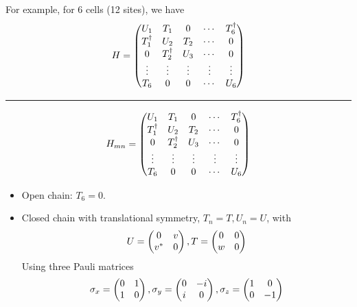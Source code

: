 \documentclass[letterpaper,10pt,english]{sphinxmanual}
\begin{document}
For example, for 6 cells (12 sites), we have
\begin{gather}
\begin{split}H=\begin{pmatrix}U_1&T_1&0&\cdots&T_6^\dagger\\
T_1^\dagger&U_2&T_2&\cdots&0\\
0&T_2^\dagger&U_3&\cdots&0\\
\vdots&\vdots&\vdots&\vdots&\vdots\\
T_6&0&0&\cdots&U_6
\end{pmatrix}\end{split}\notag
\end{gather}

\bigskip\hrule{}\bigskip

\begin{gather}
\begin{split}H_{mn}=\begin{pmatrix}U_1&T_1&0&\cdots&T_6^\dagger\\
T_1^\dagger&U_2&T_2&\cdots&0\\
0&T_2^\dagger&U_3&\cdots&0\\
\vdots&\vdots&\vdots&\vdots&\vdots\\
T_6&0&0&\cdots&U_6
\end{pmatrix}\end{split}\notag
\end{gather}\begin{itemize}
\item {} 
Open chain: \(T_6=0\).

\item {} 
Closed chain with translational symmetry, \(T_n=T,U_n=U\), with
\begin{gather}
\begin{split}U=\begin{pmatrix}0&v\\v^*&0\end{pmatrix},T=\begin{pmatrix}0&0\\w&0\end{pmatrix}\end{split}\notag
\end{gather}
Using three Pauli matrices
\begin{gather}
\begin{split}\sigma_x=\begin{pmatrix}0&1\\1&0\end{pmatrix},\sigma_y=\begin{pmatrix}0&-i\\i&0\end{pmatrix},\sigma_z=\begin{pmatrix}1&0\\0&-1\end{pmatrix}\end{split}\notag
\end{gather}
\end{itemize}
\end{document}
